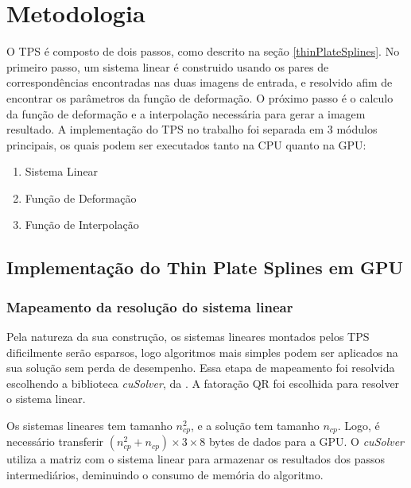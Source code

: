 \chapter{Metodologia}
\label{cap:metodologia}

  O TPS é composto de dois passos, como descrito na seção \ref{thinPlateSplines}.
No primeiro passo, um sistema linear é construido usando os pares de correspondências
encontradas nas duas imagens de entrada, e resolvido afim de encontrar os parâmetros
da função de deformação. O próximo passo é o calculo da função de deformação e
a interpolação necessária para gerar a imagem resultado. A implementação do TPS
no trabalho foi separada em 3 módulos principais, os quais podem ser executados
tanto na CPU quanto na GPU:

\begin{enumerate}
  \item Sistema Linear
  \item Função de Deformação
  \item Função de Interpolação
\end{enumerate}

\section{Implementação do Thin Plate Splines em GPU}

\subsection{Mapeamento da resolução do sistema linear}

  Pela natureza da sua construção, os sistemas lineares montados pelos TPS dificilmente
serão esparsos, logo algoritmos mais simples podem ser aplicados na sua solução
sem perda de desempenho. Essa etapa de mapeamento foi resolvida escolhendo a
biblioteca \textit{cuSolver}, da \cite{cuSolver}. A fatoração QR foi escolhida
para resolver o sistema linear.

  Os sistemas lineares tem tamanho $n_{cp}^2$, e a solução tem tamanho $n_{cp}$.
Logo, é necessário transferir $(n_{cp}^2 + n_{cp}) \times 3 \times 8$ bytes de
dados para a GPU. O \textit{cuSolver} utiliza a matriz com o sistema linear para
armazenar os resultados dos passos intermediários, deminuindo o consumo de memória
do algoritmo.

